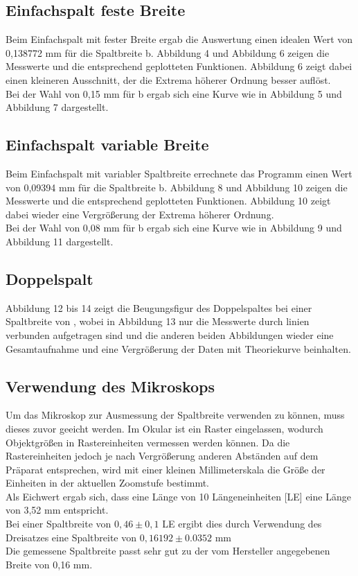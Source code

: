 \subsection{Einfachspalt feste Breite}
Beim Einfachspalt mit fester Breite ergab die Auswertung einen idealen Wert von 0,138772 mm für die Spaltbreite b. Abbildung 4 und Abbildung 6 zeigen die Messwerte und die entsprechend geplotteten Funktionen. Abbildung 6 zeigt dabei einen kleineren Ausschnitt, der die Extrema höherer Ordnung besser auflöst.\\
Bei der Wahl von 0,15 mm für b ergab sich eine Kurve wie in Abbildung 5 und Abbildung 7 dargestellt.\\

\subsection{Einfachspalt variable Breite}
Beim Einfachspalt mit variabler Spaltbreite errechnete das Programm einen Wert von 0,09394 mm für die Spaltbreite b. Abbildung 8 und Abbildung 10 zeigen die Messwerte und die entsprechend geplotteten Funktionen. Abbildung 10 zeigt dabei wieder eine Vergrößerung der Extrema höherer Ordnung.\\
Bei der Wahl von 0,08 mm für b ergab sich eine Kurve wie in Abbildung 9 und Abbildung 11 dargestellt.\\

\subsection{Doppelspalt}
Abbildung 12 bis 14 zeigt die Beugungsfigur des Doppelspaltes bei einer Spaltbreite von , wobei in Abbildung 13 nur die Messwerte durch linien verbunden aufgetragen sind und die anderen beiden Abbildungen wieder eine Gesamtaufnahme und eine Vergrößerung der Daten mit Theoriekurve beinhalten.

\subsection{Verwendung des Mikroskops}
Um das Mikroskop zur Ausmessung der Spaltbreite verwenden zu können, muss dieses zuvor geeicht werden. Im Okular ist ein Raster eingelassen, wodurch Objektgrößen in Rastereinheiten vermessen werden können. Da die Rastereinheiten jedoch je nach Vergrößerung anderen Abständen auf dem Präparat entsprechen, wird mit einer kleinen Millimeterskala die Größe der Einheiten in der aktuellen Zoomstufe bestimmt.\\
Als Eichwert ergab sich, dass eine Länge von 10 Längeneinheiten [LE] eine Länge von 3,52 mm entspricht.\\
Bei einer Spaltbreite von $0,46\pm 0,1$ LE ergibt dies durch Verwendung des Dreisatzes eine Spaltbreite von $0,16192\pm 0.0352 $ mm\\
Die gemessene Spaltbreite passt sehr gut zu der vom Hersteller angegebenen Breite von 0,16 mm. 

